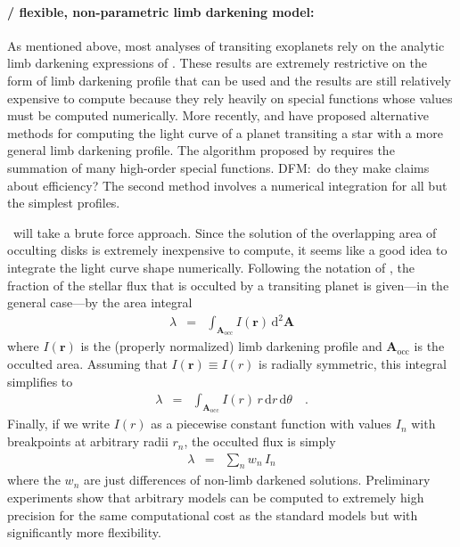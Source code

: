 \documentclass[letterpaper,12pt,preprint]{hack_aastex}
\newcommand{\Bart}{\package{Bart}}
\newcommand{\dd}{\,\mathrm{d}}
\newcommand{\bvec}[1]{\mathbf{#1}}
\begin{document}
\paragraph{\Bart / flexible, non-parametric limb darkening model:}
As mentioned above, most analyses of transiting exoplanets rely on the
analytic limb darkening expressions of \citet{mandel}.
These results are extremely restrictive on the form of limb darkening profile
that can be used and the results are still relatively expensive to compute
because they rely heavily on special functions whose values must be computed
numerically.
More recently, \citet{crazyass1} and \citet{crazyass2} have proposed
alternative methods for computing the light curve of a planet transiting a
star with a more general limb darkening profile.
The algorithm proposed by \citet{crazyass1} requires the summation of many
high-order special functions.
DFM:\ do they make claims about efficiency?
The second method \citep{crazyass2} involves a numerical integration for
all but the simplest profiles.

\Bart\ will take a brute force approach.
Since the solution of the overlapping area of occulting disks is extremely
inexpensive to compute, it seems like a good idea to integrate the light curve
shape numerically.
Following the notation of \citet{mandel}, the fraction of the stellar flux
that is occulted by a transiting planet is given---in the general case---by
the area integral
\begin{eqnarray}
\lambda & = & \int_{\bvec{A}_\mathrm{occ}} I(\bvec{r}) \dd^2 \bvec{A}
\end{eqnarray}
where $I(\bvec{r})$ is the (properly normalized) limb darkening profile and
$\bvec{A}_\mathrm{occ}$ is the occulted area.
Assuming that $I(\bvec{r}) \equiv I(r)$ is radially symmetric, this integral
simplifies to
\begin{eqnarray}
\lambda & = & \int_{\bvec{A}_\mathrm{occ}} I(r) \, r \dd r \dd \theta \quad.
\end{eqnarray}
Finally, if we write $I(r)$ as a piecewise constant function with values $I_n$
with breakpoints at arbitrary radii $r_n$, the occulted flux is simply
\begin{eqnarray}
\lambda & = & \sum_n w_n \, I_n
\end{eqnarray}
where the $w_n$ are just differences of non-limb darkened solutions.
Preliminary experiments show that arbitrary models can be computed to
extremely high precision for the same computational cost as the standard
\citet{mandel} models but with significantly more flexibility.
\end{document}
